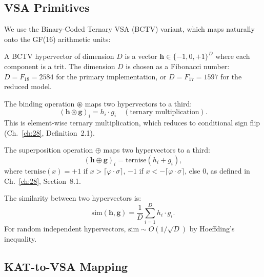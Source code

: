 \subsection{VSA Primitives}

We use the Binary-Coded Ternary VSA (BCTV) variant, which maps naturally
onto the GF(16) arithmetic units:

\begin{definition}
\label{def:hwbridge:bctv}
A BCTV hypervector of dimension $D$ is a vector
$\mathbf{h} \in \{-1, 0, +1\}^D$ where each component is a trit.
The dimension $D$ is chosen as a Fibonacci number: $D = F_{18} = 2584$
for the primary implementation, or $D = F_{17} = 1597$ for the reduced model.
\end{definition}

\begin{definition}
\label{def:hwbridge:vsa-bind}
The binding operation $\circledast$ maps two hypervectors to a third:
\[
  (\mathbf{h} \circledast \mathbf{g})_i = h_i \cdot g_i \quad (\text{ternary multiplication}).
\]
This is element-wise ternary multiplication, which reduces to
conditional sign flip (Ch.~\ref{ch:28}, Definition~2.1).
\end{definition}

\begin{definition}
\label{def:hwbridge:vsa-super}
The superposition operation $\oplus$ maps two hypervectors to a third:
\[
  (\mathbf{h} \oplus \mathbf{g})_i = \mathrm{ternise}(h_i + g_i),
\]
where $\mathrm{ternise}(x) = +1$ if $x > \lceil\varphi \cdot \sigma\rceil$,
$-1$ if $x < -\lceil\varphi \cdot \sigma\rceil$, else $0$, as defined in
Ch.~\ref{ch:28}, Section~8.1.
\end{definition}

\begin{definition}
\label{def:hwbridge:vsa-sim}
The similarity between two hypervectors is:
\[
  \mathrm{sim}(\mathbf{h}, \mathbf{g}) = \frac{1}{D} \sum_{i=1}^{D} h_i \cdot g_i.
\]
For random independent hypervectors, $\mathrm{sim} \sim O(1/\sqrt{D})$ by
Hoeffding's inequality.
\end{definition}

\subsection{KAT-to-VSA Mapping}

